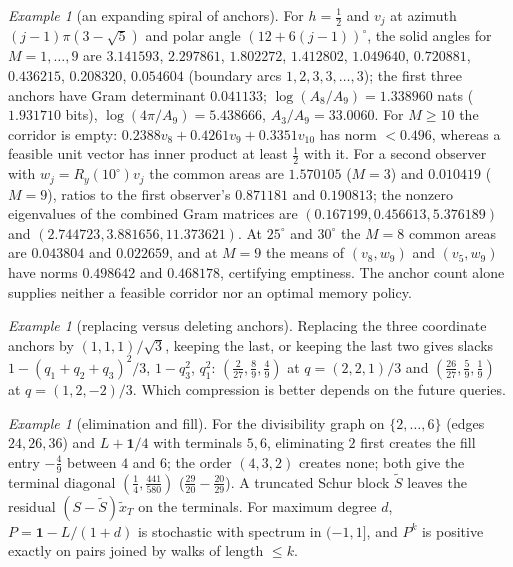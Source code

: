 \documentclass[aps,pra,onecolumn,superscriptaddress,nofootinbib,10pt]{revtex4-2}
\theoremstyle{definition}
\theoremstyle{remark}
\newtheorem{example}[theorem]{Example}
\begin{document}
\begin{example}[an expanding spiral of anchors]\label{ex:fmspiral}
For $h=\tfrac12$ and $v_j$ at azimuth $(j-1)\pi(3-\sqrt5)$ and polar angle $(12+6(j-1))^\circ$, the solid angles for $M=1,\dots,9$ are
$3.141593$, $2.297861$, $1.802272$, $1.412802$, $1.049640$, $0.720881$, $0.436215$, $0.208320$, $0.054604$ (boundary arcs $1,2,3,3,\dots,3$); the
first three anchors have Gram determinant $0.041133$; $\log(A_8/A_9)=1.338960$ nats ($1.931710$ bits), $\log(4\pi/A_9)=5.438666$, $A_3/A_9=33.0060$.
For $M\ge10$ the corridor is empty: $0.2388v_8+0.4261v_9+0.3351v_{10}$ has norm $<0.496$, whereas a feasible unit vector has inner
product at least $\tfrac12$ with it.  For a second observer with $w_j=R_y(10^\circ)v_j$ the common areas are $1.570105$ ($M=3$) and
$0.010419$ ($M=9$), ratios to the first observer's $0.871181$ and $0.190813$; the nonzero eigenvalues of the combined Gram
matrices are $(0.167199,0.456613,5.376189)$ and $(2.744723,3.881656,11.373621)$.  At $25^\circ$ and $30^\circ$ the $M=8$ common areas are $0.043804$
and $0.022659$, and at $M=9$ the means of $(v_8,w_9)$ and $(v_5,w_9)$ have norms $0.498642$ and $0.468178$, certifying emptiness.  The
anchor count alone supplies neither a feasible corridor nor an optimal memory policy.
\end{example}

\begin{example}[replacing versus deleting anchors]\label{ex:fmcentroid}
Replacing the three coordinate anchors by $(1,1,1)/\sqrt3$, keeping the last, or keeping the last two gives slacks
$1-(q_1+q_2+q_3)^2/3$, $1-q_3^2$, $q_1^2$: $(\tfrac2{27},\tfrac89,\tfrac49)$ at $q=(2,2,1)/3$ and $(\tfrac{26}{27},\tfrac59,\tfrac19)$ at $q=(1,2,-2)/3$.  Which compression is
better depends on the future queries.
\end{example}

\begin{example}[elimination and fill]\label{ex:fmfill}
For the divisibility graph on $\{2,\dots,6\}$ (edges $24,26,36$) and $L+\mathbf1/4$ with terminals $5,6$, eliminating $2$ first creates the
fill entry $-\tfrac49$ between $4$ and $6$; the order $(4,3,2)$ creates none; both give the terminal diagonal $(\tfrac14,\tfrac{441}{580})$
($\tfrac{29}{20}-\tfrac{20}{29}$).  A truncated Schur block $\tilde S$ leaves the residual $(S-\tilde S)\tilde x_T$ on the terminals.  For maximum degree $d$,
$P=\mathbf1-L/(1+d)$ is stochastic with spectrum in $(-1,1]$, and $P^k$ is positive exactly on pairs joined by walks of length $\le k$.
\end{example}
\end{document}
